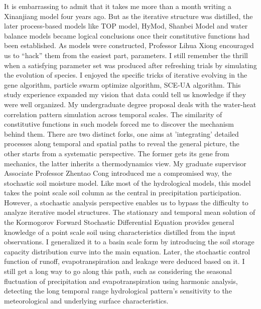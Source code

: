 \documentclass{article}
\begin{document}
{It is embarrassing to admit that it takes me more than a month writing a Xinanjiang model four years ago. But as the iterative structure was distilled, the later process-based models like TOP model, HyMod, Shanbei Model and water balance models became logical conclusions once their constitutive functions had been established. As models were constructed, Professor Lihua Xiong encouraged us to “hack” them from the easiest part, parameters. I still remember the thrill when a satisfying parameter set was produced after refreshing trials by simulating the evolution of species. I enjoyed the specific tricks of iterative evolving in the gene algorithm, particle swarm optimize algorithm, SCE-UA algorithm. This study experience expanded my vision that data could tell us knowledge if they were well organized.
My undergraduate degree proposal deals with the water-heat correlation pattern simulation across temporal scales. The similarity of constitutive functions in such models forced me to discover the mechanism behind them. There are two distinct forks, one aims at 'integrating' detailed processes along temporal and spatial paths to reveal the general picture, the other starts from a systematic perspective. The former gets its gene from mechanics, the latter inherits a thermodynamics view. My graduate supervisor Associate Professor Zhentao Cong introduced me a compromised way, the stochastic soil moisture model. Like most of the hydrological models, this model takes the point scale soil column as the central in precipitation participation. However, a stochastic analysis perspective enables us to bypass the difficulty to analyze iterative model structures. The stationary and temporal mean solution of the Kormogorov Forward Stochastic Differential Equation provides general knowledge of a point scale soil using characteristics distilled from the input observations. I generalized it to a basin scale form by introducing the soil storage capacity distribution curve into the main equation. Later, the stochastic control function of runoff, evapotranspiration and leakage were deduced based on it. I still get a long way to go along this path, such as considering the seasonal fluctuation of precipitation and evapotranspiration using harmonic analysis, detecting the long temporal range hydrological pattern's sensitivity to the meteorological and underlying surface characteristics.
}
\end{document}
